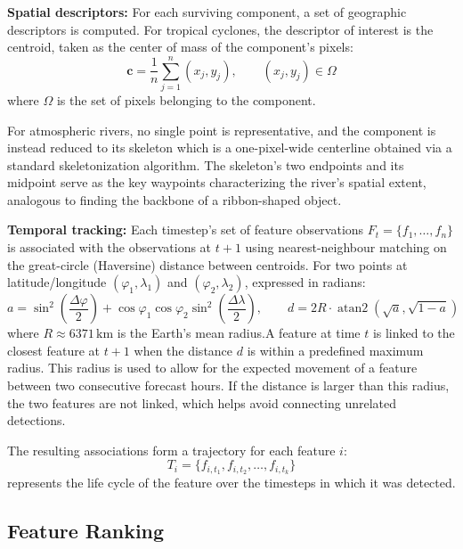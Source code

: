 \documentclass[journal abbreviation, manuscript]{copernicus}
\begin{document}
\textbf{Spatial descriptors:} For each surviving component, a set of geographic descriptors is computed. For tropical cyclones, the descriptor of interest is the centroid, taken as the center of mass of the component's pixels:
\begin{equation}
\mathbf{c} = \frac{1}{n}\sum_{j=1}^{n}(x_j,y_j),
\qquad
(x_j,y_j) \in \Omega
\tag{2}
\end{equation}
where $\Omega$ is the set of pixels belonging to the component.

For atmospheric rivers, no single point is representative, and the component is instead reduced to its skeleton which is a one-pixel-wide centerline obtained via a standard skeletonization algorithm. The skeleton's two endpoints and its midpoint serve as the key waypoints characterizing the river's spatial extent, analogous to finding the backbone of a ribbon-shaped object.

\textbf{Temporal tracking:} Each timestep's set of feature observations $F_t = \{f_1,\dots,f_n\}$ is associated with the observations at $t+1$ using nearest-neighbour matching on the great-circle (Haversine) distance between centroids. For two points at latitude/longitude $(\varphi_1,\lambda_1)$ and $(\varphi_2,\lambda_2)$, expressed in radians:
\begin{equation}
a =
\sin^2\!\left(\frac{\Delta\varphi}{2}\right)
+
\cos\varphi_1\cos\varphi_2
\sin^2\!\left(\frac{\Delta\lambda}{2}\right),
\qquad
d =
2R \cdot
\operatorname{atan2}\!\left(\sqrt{a},\sqrt{1-a}\right)
\tag{3}
\end{equation}
where $R \approx 6371\,\text{km}$ is the Earth's mean radius.A feature at time $t$ is linked to the closest feature at $t+1$ when the distance $d$ is within a predefined maximum radius. This radius is used to allow for the expected movement of a feature between two consecutive forecast hours. If the distance is larger than this radius, the two features are not linked, which helps avoid connecting unrelated detections. 

The resulting associations form a trajectory for each feature $i$:
\begin{equation}
T_i = \{f_{i,t_1}, f_{i,t_2}, \dots, f_{i,t_k}\}
\tag{4}
\end{equation} represents the life cycle of the feature over the timesteps in which it was detected.

\subsection{Feature Ranking}
\end{document}
